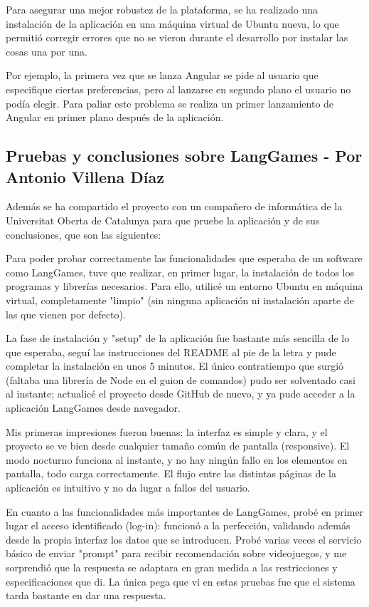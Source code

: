 Para asegurar una mejor robustez de la plataforma, se ha realizado una instalación de la aplicación en una máquina virtual de Ubuntu nueva, lo que permitió corregir errores que no se vieron durante el desarrollo por instalar las cosas una por una. 

Por ejemplo, la primera vez que se lanza Angular se pide al usuario que especifique ciertas preferencias, pero al lanzarse en segundo plano el usuario no podía elegir. Para paliar este problema se realiza un primer lanzamiento de Angular en primer plano después de la aplicación.

\subsection{Pruebas y conclusiones sobre LangGames - Por Antonio Villena Díaz}

Además se ha compartido el proyecto con un compañero de informática de la Universitat Oberta de Catalunya para que pruebe la aplicación y de sus conclusiones, que son las siguientes: 

Para poder probar correctamente las funcionalidades que esperaba de un software como LangGames, tuve que realizar, en primer lugar, la instalación de todos los programas y librerías necesarios. Para ello, utilicé un entorno Ubuntu en máquina virtual, completamente "limpio" (sin ninguna aplicación ni instalación aparte de las que vienen por defecto).

La fase de instalación y "setup" de la aplicación fue bastante más sencilla de lo que esperaba, seguí las instrucciones del README al pie de la letra y pude completar la instalación en unos 5 minutos. El único contratiempo que surgió (faltaba una librería de Node en el guion de comandos) pudo ser solventado casi al instante; actualicé el proyecto desde GitHub de nuevo, y ya pude acceder a la aplicación LangGames desde navegador.

Mis primeras impresiones fueron buenas: la interfaz es simple y clara, y el proyecto se ve bien desde cualquier tamaño común de pantalla (responsive). El modo nocturno funciona al instante, y no hay ningún fallo en los elementos en pantalla, todo carga correctamente. El flujo entre las distintas páginas de la aplicación es intuitivo y no da lugar a fallos del usuario.

En cuanto a las funcionalidades más importantes de LangGames, probé en primer lugar el acceso identificado (log-in): funcionó a la perfección, validando además desde la propia interfaz los datos que se introducen. Probé varias veces el servicio básico de enviar "prompt" para recibir recomendación sobre videojuegos, y me sorprendió que la respuesta se adaptara en gran medida a las restricciones y especificaciones que di. La única pega que vi en estas pruebas fue que el sistema tarda bastante en dar una respuesta.

